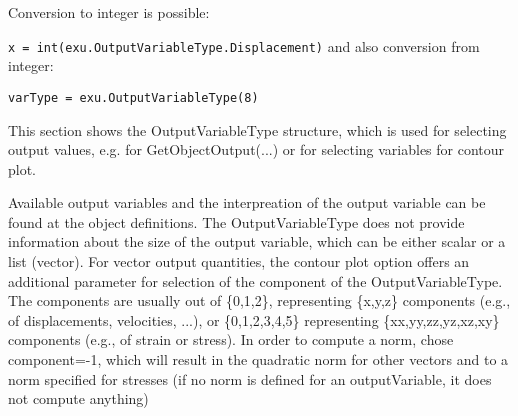 Conversion to integer is possible: 
 \bi 
 \item[] \texttt{x = int(exu.OutputVariableType.Displacement)} 
\ei and also conversion from integer: 
 \bi 
 \item[] \texttt{varType = exu.OutputVariableType(8)}
 \ei

\label{sec:OutputVariableType}
This section shows the OutputVariableType structure, which is used for selecting output values, e.g. for GetObjectOutput(...) or for selecting variables for contour plot.

Available output variables and the interpreation of the output variable can be found at the object definitions. 
 The OutputVariableType does not provide information about the size of the output variable, which can be either scalar or a list (vector). For vector output quantities, the contour plot option offers an additional parameter for selection of the component of the OutputVariableType. The components are usually out of \{0,1,2\}, representing \{x,y,z\} components (e.g., of displacements, velocities, ...), or \{0,1,2,3,4,5\} representing \{xx,yy,zz,yz,xz,xy\} components (e.g., of strain or stress). In order to compute a norm, chose component=-1, which will result in the quadratic norm for other vectors and to a norm specified for stresses (if no norm is defined for an outputVariable, it does not compute anything)


